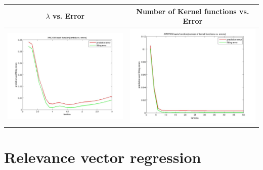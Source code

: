 \documentclass[fleqn]{article}
\begin{document}
\begin{center}
  \begin{longtable}{ c | c }
	\multicolumn{1}{c}{$\lambda$ vs. Error} & 
	\multicolumn{1}{c}{Number of Kernel functions vs. Error}  \\
    \hline
    \includegraphics[scale=0.2]{./pics/task4/ARCTAN basis function_fitting_lambda_errors.jpg}  & \includegraphics[scale=0.2]{./pics/task4/ARCTAN basis function_numfunctions_errors.jpg} \\
    \hline
  \end{longtable}
\end{center}

\newpage
\section{Relevance vector regression}
\end{document}
